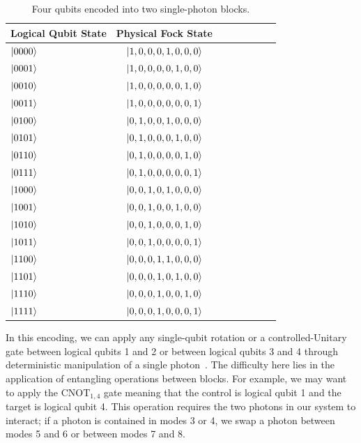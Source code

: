 \documentclass[aps,pra,twocolumn,showpacs,superscriptaddress,floatfix,10pt]{revtex4}
\begin{document}
\begin {table}[h]
\begin{center}
	\begin{tabular}{l*{6}{c}r} 
		Logical Qubit State      \quad \quad \quad     & Physical Fock State \\
		\hline 
		\quad \quad \quad $\ket{0000}$     & $\ket{1,0,0,0,1,0,0,0}$ \\
		\quad \quad \quad $\ket{0001}$            & $\ket{1,0,0,0,0,1,0,0}$ \\
		\quad \quad \quad $\ket{0010}$           & 
		$\ket{1,0,0,0,0,0,1,0}$ \\
		\quad \quad \quad $\ket{0011}$           & 
		$\ket{1,0,0,0,0,0,0,1}$ \\
		\quad \quad \quad $\ket{0100}$           & 
		$\ket{0,1,0,0,1,0,0,0}$ \\
		\quad \quad \quad $\ket{0101}$           & 
		$\ket{0,1,0,0,0,1,0,0}$ \\
		\quad \quad \quad $\ket{0110}$           & 
		$\ket{0,1,0,0,0,0,1,0}$ \\
		\quad \quad \quad $\ket{0111}$            & $\ket{0,1,0,0,0,0,0,1}$ \\
		\quad \quad \quad $\ket{1000}$            & $\ket{0,0,1,0,1,0,0,0}$ \\
		\quad \quad \quad $\ket{1001}$            & $\ket{0,0,1,0,0,1,0,0}$ \\
		\quad \quad \quad $\ket{1010}$            & $\ket{0,0,1,0,0,0,1,0}$ \\
		\quad \quad \quad $\ket{1011}$            & $\ket{0,0,1,0,0,0,0,1}$ \\
		\quad \quad \quad $\ket{1100}$            & $\ket{0,0,0,1,1,0,0,0}$ \\
		\quad \quad \quad $\ket{1101}$            & $\ket{0,0,0,1,0,1,0,0}$ \\
		\quad \quad \quad $\ket{1110}$            & $\ket{0,0,0,1,0,0,1,0}$ \\
		\quad \quad \quad $\ket{1111}$            & $\ket{0,0,0,1,0,0,0,1}$ \\
	\end{tabular}
	\caption{ \label{Block Encoding Table} Four qubits encoded into two single-photon blocks.}
\end{center}
\end{table}
In this encoding, we can apply any single-qubit rotation or a controlled-Unitary gate between logical qubits 1 and 2 or between logical qubits 3 and 4 through deterministic manipulation of a single photon~\cite{Review Paper,Adami,Lanyon,Bao,Zadeh}. The difficulty here lies in the application of entangling operations between blocks. For example, we may want to apply the $\mbox{CNOT}_{1,4}$ gate meaning that the control is logical qubit 1 and the target is logical qubit 4. This operation requires the two photons in our system to interact; if a photon is contained in modes 3 or 4, we swap a photon between modes 5 and 6 or between modes 7 and 8. 
\end{document}
